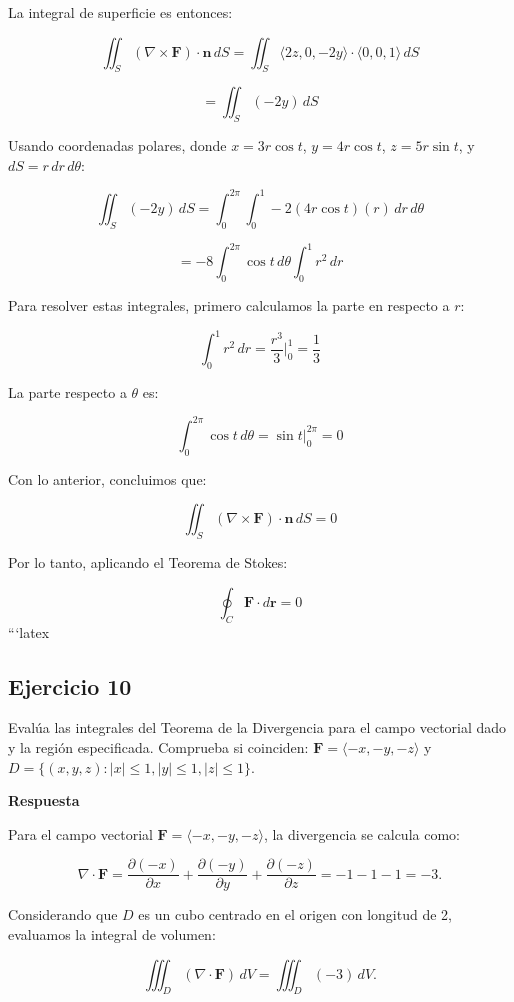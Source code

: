 \documentclass{report}
\begin{document}
La integral de superficie es entonces:

\[
\iint_S (\nabla \times \mathbf{F}) \cdot \mathbf{n} \, dS = \iint_S \langle 2z, 0, -2y \rangle \cdot \langle 0, 0, 1 \rangle \, dS
\]

\[
= \iint_S (-2y) \, dS
\]

Usando coordenadas polares, donde \( x = 3r\cos t \), \( y = 4r\cos t \), \( z = 5r\sin t \), y \( dS = r \, dr \, d\theta \):

\[
\iint_S (-2y) \, dS = \int_0^{2\pi} \int_0^1 -2(4r\cos t)(r) \, dr \, d\theta
\]

\[
= -8 \int_0^{2\pi} \cos t \, d\theta \int_0^1 r^2 \, dr
\]

Para resolver estas integrales, primero calculamos la parte en respecto a \( r \):

\[
\int_0^1 r^2 \, dr = \frac{r^3}{3} \bigg|_0^1 = \frac{1}{3}
\]

La parte respecto a \( \theta \) es:

\[
\int_0^{2\pi} \cos t \, d\theta = \sin t \bigg|_0^{2\pi} = 0
\]

Con lo anterior, concluimos que:

\[
\iint_S (\nabla \times \mathbf{F}) \cdot \mathbf{n} \, dS = 0
\]

Por lo tanto, aplicando el Teorema de Stokes:

\[
{\oint_C \mathbf{F} \cdot d\mathbf{r} = 0}
\]
```latex


\subsection*{Ejercicio 10}
Evalúa las integrales del Teorema de la Divergencia para el campo vectorial dado y la región especificada. Comprueba si coinciden:  \( \mathbf{F}=\langle -x,-y,-z\rangle \) y \( D=\{(x, y, z): |x| \leq 1, |y| \leq 1, |z| \leq 1\} \).

\textbf{Respuesta}


Para el campo vectorial \( \mathbf{F} = \langle -x, -y, -z \rangle \), la divergencia se calcula como:

\[
\nabla \cdot \mathbf{F} = \frac{\partial (-x)}{\partial x} + \frac{\partial (-y)}{\partial y} + \frac{\partial (-z)}{\partial z} = -1 - 1 - 1 = -3.
\]



Considerando que \( D \) es un cubo centrado en el origen con longitud de 2, evaluamos la integral de volumen:

\[
\iiint_{D} (\nabla \cdot \mathbf{F}) \, dV = \iiint_{D} (-3) \, dV.
\]
\end{document}
